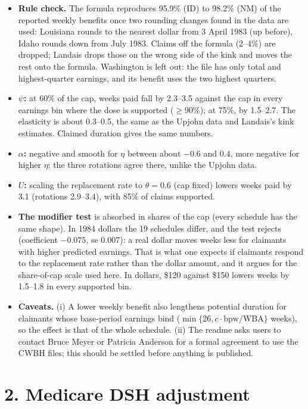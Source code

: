 \documentclass[10pt]{article}
\begin{document}
\begin{itemize}
\item \textbf{Rule check.} The formula reproduces 95.9\% (ID) to 98.2\% (NM) of the reported
 weekly benefits once two rounding changes found in the data are used: Louisiana rounds to
 the nearest dollar from 3 April 1983 (up before), Idaho rounds down from July 1983. Claims
 off the formula (2--4\%) are dropped; Landais drops those on the wrong side of the kink and
 moves the rest onto the formula. Washington is left out: the file has
 only total and highest-quarter earnings, and its benefit uses the two highest quarters.
\item \textbf{$\psi$:} at 60\% of the cap, weeks paid fall by 2.3--3.5 against the cap in every
 earnings bin where the dose is supported ($\ge$90\%); at 75\%, by 1.5--2.7. The elasticity
 is about 0.3--0.5, the same as the Upjohn data and Landais's kink estimates. Claimed
 duration gives the same numbers.
\item \textbf{$\alpha$:} negative and smooth for $\eta$ between about $-0.6$ and $0.4$, more
 negative for higher $\eta$; the three rotations agree there, unlike the Upjohn data.
\item \textbf{$U$:} scaling the replacement rate to $\theta=0.6$ (cap fixed) lowers weeks paid by
 3.1 (rotations 2.9--3.4), with 85\% of claims supported.
\item \textbf{The modifier test} is absorbed in shares of the cap (every schedule has the same
 shape). In 1984 dollars the 19 schedules differ, and the test rejects (coefficient $-0.075$,
 se 0.007): a real dollar moves weeks less for claimants with higher predicted earnings.
 That is what one expects if claimants respond to the replacement rate rather than the dollar
 amount, and it argues for the share-of-cap scale used here. In dollars, \$120 against \$150
 lowers weeks by 1.5--1.8 in every supported bin.
\item \textbf{Caveats.} (i) A lower weekly benefit also lengthens potential duration for
 claimants whose base-period earnings bind ($\min\{26, c\cdot\text{bpw}/\text{WBA}\}$ weeks), so the
 effect is that of the whole schedule. (ii) The readme asks users to contact Bruce Meyer or
 Patricia Anderson for a formal agreement to use the CWBH files; this should be settled
 before anything is published.
\end{itemize}

\section*{2. Medicare DSH adjustment}
\end{document}
